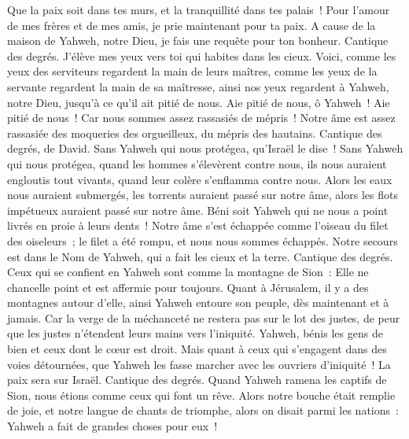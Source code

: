 \begin{multicols}{2}
Que la paix soit dans tes murs, et la tranquillité dans tes palais~!
Pour l'amour de mes frères et de mes amis, je prie maintenant pour ta paix.
A cause de la maison de Yahweh, notre Dieu, je fais une requête pour ton bonheur.
\VerseOne{}Cantique des degrés. J'élève mes yeux vers toi qui habites dans les cieux.
Voici, comme les yeux des serviteurs regardent la main de leurs maîtres, comme les yeux de la servante regardent la main de sa maîtresse, ainsi nos yeux regardent à Yahweh, notre Dieu, jusqu'à ce qu'il ait pitié de nous.
Aie pitié de nous, ô Yahweh~! Aie pitié de nous~! Car nous sommes assez rassasiés de mépris~!
Notre âme est assez rassasiée des moqueries des orgueilleux, du mépris des hautains.
\VerseOne{}Cantique des degrés, de David. Sans Yahweh qui nous protégea, qu'Israël le dise~!
Sans Yahweh qui nous protégea, quand les hommes s'élevèrent contre nous,
ils nous auraient engloutis tout vivants, quand leur colère s'enflamma contre nous.
Alors les eaux nous auraient submergés, les torrents auraient passé sur notre âme,
alors les flots impétueux auraient passé sur notre âme.
Béni soit Yahweh qui ne nous a point livrés en proie à leurs dents~!
Notre âme s'est échappée comme l'oiseau du filet des oiseleurs~; le filet a été rompu, et nous nous sommes échappés.
Notre secours est dans le Nom de Yahweh, qui a fait les cieux et la terre.
\VerseOne{}Cantique des degrés. Ceux qui se confient en Yahweh sont comme la montagne de Sion~: Elle ne chancelle point et est affermie pour toujours.
Quant à Jérusalem, il y a des montagnes autour d'elle, ainsi Yahweh entoure son peuple, dès maintenant et à jamais.
Car la verge de la méchanceté ne restera pas sur le lot des justes, de peur que les justes n'étendent leurs mains vers l'iniquité.
Yahweh, bénis les gens de bien et ceux dont le cœur est droit.
Mais quant à ceux qui s'engagent dans des voies détournées, que Yahweh les fasse marcher avec les ouvriers d'iniquité~! La paix sera sur Israël.
\VerseOne{}Cantique des degrés. Quand Yahweh ramena les captifs de Sion, nous étions comme ceux qui font un rêve.
Alors notre bouche était remplie de joie, et notre langue de chants de triomphe, alors on disait parmi les nations~: Yahweh a fait de grandes choses pour eux~!

\end{multicols}
